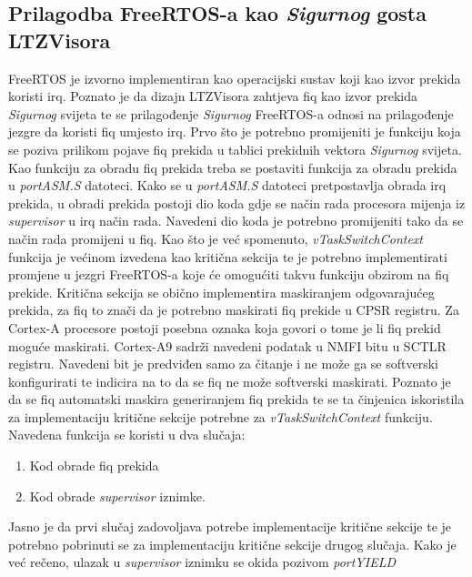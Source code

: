 \documentclass[times, utf8, diplomski, numeric]{fer}
\begin{document}
\subsection{Prilagodba FreeRTOS-a kao \textit{Sigurnog} gosta LTZVisora}
FreeRTOS je izvorno implementiran kao operacijski sustav koji kao izvor prekida koristi \gls{irq}. Poznato je da dizajn LTZVisora
zahtjeva \gls{fiq} kao izvor prekida \textit{Sigurnog} svijeta te se prilagođenje \textit{Sigurnog} FreeRTOS-a odnosi na
prilagođenje jezgre da koristi \gls{fiq} umjesto \gls{irq}. Prvo što je potrebno promijeniti je funkciju koja se poziva prilikom pojave
\gls{fiq} prekida u tablici prekidnih vektora \textit{Sigurnog} svijeta. Kao funkciju za obradu \gls{fiq} prekida treba se postaviti
funkcija za obradu prekida u \textit{portASM.S} datoteci. Kako se u \textit{portASM.S} datoteci pretpostavlja obrada \gls{irq}
prekida, u obradi prekida postoji dio koda gdje se način rada procesora mijenja iz \textit{supervisor} u \gls{irq} način rada.
Navedeni dio koda je potrebno promijeniti tako da se način rada promijeni u \gls{fiq}. Kao što je već spomenuto,
\textit{vTaskSwitchContext} funkcija je većinom izvedena kao kritična sekcija te je potrebno implementirati promjene u
jezgri FreeRTOS-a koje će omogućiti takvu funkciju obzirom na \gls{fiq} prekide. Kritična sekcija se obično implementira
maskiranjem odgovarajućeg prekida, za \gls{fiq} to znači da je potrebno maskirati \gls{fiq} prekide u CPSR registru. Za Cortex-A procesore
postoji posebna oznaka koja govori o tome je li \gls{fiq} prekid moguće maskirati. Cortex-A9 sadrži navedeni podatak u NMFI
 bitu u SCTLR registru. Navedeni bit je predviđen samo za čitanje i ne može ga se
softverski konfigurirati te indicira na to da se \gls{fiq} ne može softverski maskirati. Poznato je da se \gls{fiq} automatski maskira
generiranjem \gls{fiq} prekida te se ta činjenica iskoristila za implementaciju kritične sekcije potrebne za
\textit{vTaskSwitchContext} funkciju.
\newpage
Navedena funkcija se koristi u dva slučaja:
\begin{enumerate}
  \item {Kod obrade \gls{fiq} prekida}
  \item{Kod obrade \textit{supervisor} iznimke.}
\end{enumerate}
Jasno je da prvi slučaj zadovoljava potrebe implementacije kritične sekcije te je potrebno pobrinuti se za implementaciju
kritične sekcije drugog slučaja. Kako je već rečeno, ulazak u \textit{supervisor} iznimku se okida pozivom \textit{portYIELD}
\end{document}

